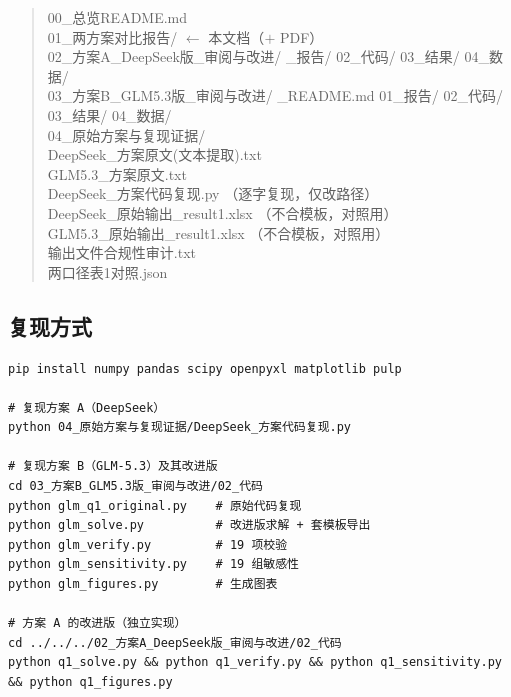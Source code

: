 \documentclass[12pt,a4paper]{ctexart}
\begin{document}
\begin{quote}\ttfamily\small
00\_总览README.md\\
01\_两方案对比报告/ \quad $\leftarrow$ 本文档（$+$ PDF）\\
02\_方案A\_DeepSeek版\_审阅与改进/ \_报告/ 02\_代码/ 03\_结果/ 04\_数据/\\
03\_方案B\_GLM5.3版\_审阅与改进/ \_README.md 01\_报告/ 02\_代码/ 03\_结果/ 04\_数据/\\
04\_原始方案与复现证据/\\
\quad DeepSeek\_方案原文(文本提取).txt\\
\quad GLM5.3\_方案原文.txt\\
\quad DeepSeek\_方案代码复现.py \quad（逐字复现，仅改路径）\\
\quad DeepSeek\_原始输出\_result1.xlsx \quad（不合模板，对照用）\\
\quad GLM5.3\_原始输出\_result1.xlsx \quad（不合模板，对照用）\\
\quad 输出文件合规性审计.txt\\
\quad 两口径表1对照.json
\end{quote}

\subsection*{复现方式}
\begin{Verbatim}[fontsize=\small]
pip install numpy pandas scipy openpyxl matplotlib pulp

# 复现方案 A（DeepSeek）
python 04_原始方案与复现证据/DeepSeek_方案代码复现.py

# 复现方案 B（GLM-5.3）及其改进版
cd 03_方案B_GLM5.3版_审阅与改进/02_代码
python glm_q1_original.py    # 原始代码复现
python glm_solve.py          # 改进版求解 + 套模板导出
python glm_verify.py         # 19 项校验
python glm_sensitivity.py    # 19 组敏感性
python glm_figures.py        # 生成图表

# 方案 A 的改进版（独立实现）
cd ../../../02_方案A_DeepSeek版_审阅与改进/02_代码
python q1_solve.py && python q1_verify.py && python q1_sensitivity.py && python q1_figures.py
\end{Verbatim}
\end{document}
